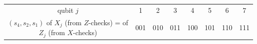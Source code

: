 \begin{tabular}{@{}cccccccc@{}}\toprule
qubit $j$ & 1 & 2 & 3 & 4 & 5 & 6 & 7\\
$(s_4,s_2,s_1)$ of $X_j$ (from $Z$-checks) = of $Z_j$ (from $X$-checks) & 001 & 010 & 011 & 100 & 101 & 110 & 111\\
\bottomrule\end{tabular}
